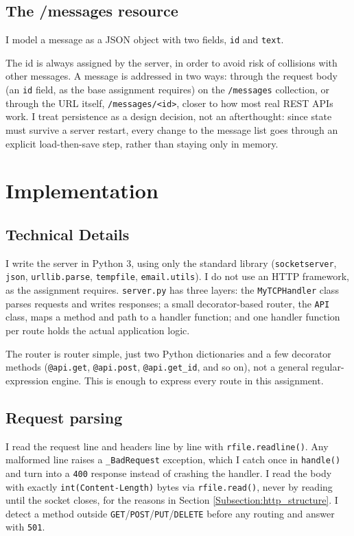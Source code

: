 \documentclass[conference]{IEEEtran}
\begin{document}
\subsection{The /messages resource}\label{Subsection:design_messages}
I model a message as a JSON object with two fields, \texttt{id} and
\texttt{text}.

The id is always assigned by the server, in order to avoid risk of collisions with other
messages. A message is addressed in two ways: through the request body (an
\texttt{id} field, as the base assignment requires) on the
\texttt{/messages} collection, or through the URL itself,
\texttt{/messages/<id>}, closer to how most real REST APIs work. I treat
persistence as a design decision, not an afterthought: since state must
survive a server restart, every change to the message list goes through an
explicit load-then-save step, rather than staying only in memory.

\section{Implementation}\label{Section:Implementation}

\subsection{Technical Details}\label{Subsection:Technical_details}
I write the server in Python 3, using only the standard library
(\texttt{socketserver}, \texttt{json}, \texttt{urllib.parse},
\texttt{tempfile}, \texttt{email.utils}). I do not use an HTTP framework,
as the assignment requires. \texttt{server.py} has three layers: the
\texttt{MyTCPHandler} class parses requests and writes responses; a small
decorator-based router, the \texttt{API} class, maps a method and path to
a handler function; and one handler function per route holds the actual
application logic.

The router is router simple, just two Python dictionaries and a few decorator
methods (\texttt{@api.get}, \texttt{@api.post}, \texttt{@api.get\_id}, and
so on), not a general regular-expression engine. This is enough to express
every route in this assignment.

\subsection{Request parsing}\label{Subsection:impl_parsing}
I read the request line and headers line by line with
\texttt{rfile.readline()}. Any malformed
line raises a \texttt{\_BadRequest} exception, which I catch once in
\texttt{handle()} and turn into a \texttt{400} response instead of
crashing the handler. I read the body with exactly
\texttt{int(Content-Length)} bytes via \texttt{rfile.read()}, never by
reading until the socket closes, for the reasons in Section
\ref{Subsection:http_structure}. I detect a method outside
\texttt{GET}/\texttt{POST}/\texttt{PUT}/\texttt{DELETE} before any routing
and answer with \texttt{501}.
\end{document}
